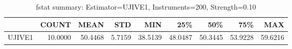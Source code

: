 \begin{table}[ht]
\centering
\caption{fstat summary: Estimator=UJIVE1, Instruments=200, Strength=0.10}
\begin{tabular}{lrrrrrrrr}
\toprule
 & COUNT & MEAN & STD & MIN & 25\% & 50\% & 75\% & MAX \\
\midrule
UJIVE1 & 10.0000 & 50.4468 & 5.7159 & 38.5139 & 48.0487 & 50.3445 & 53.9228 & 59.6216 \\
\bottomrule
\end{tabular}
\end{table}
